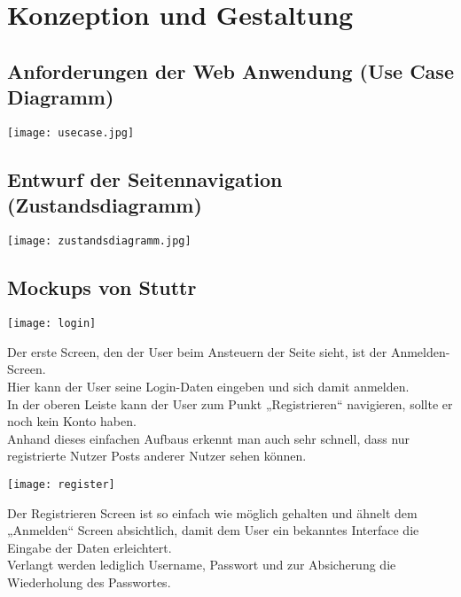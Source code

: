 \chapter{Konzeption und Gestaltung}

  \section{Anforderungen der Web Anwendung (Use Case Diagramm)}
    \begin{center}
      \texttt{[image: usecase.jpg]}
    \end{center}

\newpage
  \section{Entwurf der Seitennavigation (Zustandsdiagramm)}
    \begin{center}
      \texttt{[image: zustandsdiagramm.jpg]}
    \end{center}

\newpage
  \section{Mockups von Stuttr}
    \begin{center}
      \texttt{[image: login]}
    \end{center}

    Der erste Screen, den der User beim Ansteuern der Seite sieht, ist der Anmelden-Screen. \\
    Hier kann der User seine Login-Daten eingeben und sich damit anmelden. \\
    In der oberen Leiste kann der User zum Punkt „Registrieren“ navigieren, sollte er noch kein Konto haben. \\
    Anhand dieses einfachen Aufbaus erkennt man auch sehr schnell, dass nur registrierte Nutzer Posts anderer Nutzer sehen können.

    \begin{center}
      \texttt{[image: register]}
    \end{center}

    Der Registrieren Screen ist so einfach wie möglich gehalten und ähnelt dem „Anmelden“ Screen absichtlich, damit dem User ein bekanntes Interface die Eingabe der Daten erleichtert. \\
    Verlangt werden lediglich Username, Passwort und zur Absicherung die Wiederholung des Passwortes.

